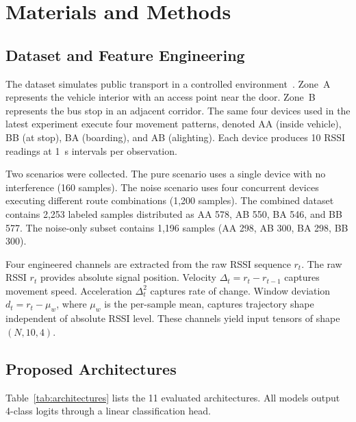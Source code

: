 \section{Materials and Methods}

\subsection{Dataset and Feature Engineering}

The dataset simulates public transport in a controlled environment~\cite{ribeiro2026eucnc}. Zone~A represents the vehicle interior with an access point near the door. Zone~B represents the bus stop in an adjacent corridor. The same four devices used in the latest experiment \cite{ribeiro2026eucnc} execute four movement patterns, denoted AA (inside vehicle), BB (at stop), BA (boarding), and AB (alighting). Each device produces 10 RSSI readings at 1~s intervals per observation.

Two scenarios were collected. The pure scenario uses a single device with no interference (160 samples). The noise scenario uses four concurrent devices executing different route combinations (1,200 samples). The combined dataset contains 2,253 labeled samples distributed as AA 578, AB 550, BA 546, and BB 577. The noise-only subset contains 1,196 samples (AA 298, AB 300, BA 298, BB 300).

Four engineered channels are extracted from the raw RSSI sequence $r_t$. The raw RSSI $r_t$ provides absolute signal position. Velocity $\Delta_t = r_t - r_{t-1}$ captures movement speed. Acceleration $\Delta^2_t$ captures rate of change. Window deviation $d_t = r_t - \mu_w$, where $\mu_w$ is the per-sample mean, captures trajectory shape independent of absolute RSSI level. These channels yield input tensors of shape $(N, 10, 4)$.

\subsection{Proposed Architectures}

Table~\ref{tab:architectures} lists the 11 evaluated architectures. All models output 4-class logits through a linear classification head.


